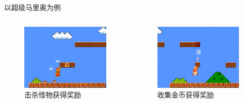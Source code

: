 \begin{frame}{以超级马里奥为例}

    \begin{columns}


        \begin{figure}
            \centering
            \includegraphics[scale=0.08]{pics/mario2.png}
            \caption{击杀怪物获得奖励}
        \end{figure}


        \begin{figure}
            \centering
            \includegraphics[scale=0.08]{pics/mario3.png}
            \caption{收集金币获得奖励}
        \end{figure}


\end{columns}
\end{frame}
